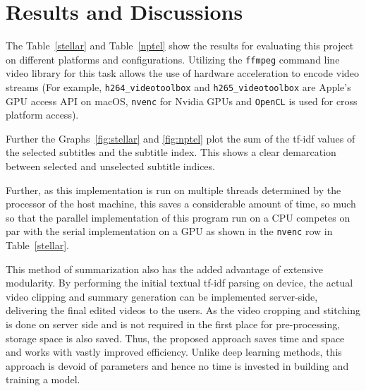 
\chapter{Results and Discussions} %

\label{Chapter4} %



	The Table~\ref{stellar} and Table~\ref{nptel} show the results for evaluating this project on different platforms and configurations. Utilizing the \texttt{ffmpeg} command line video library for this task allows the use of hardware acceleration to encode video streams (For example, \texttt{h264\_videotoolbox} and \texttt{h265\_videotoolbox} are Apple's GPU access API on macOS, \verb|nvenc| for Nvidia GPUs and \texttt{OpenCL} is used for cross platform access). 
	
	Further the Graphs~\ref{fig:stellar} and \ref{fig:nptel} plot the sum of the tf-idf values of the selected subtitles and the subtitle index. This shows a clear demarcation between selected and unselected subtitle indices.
	
	Further, as this implementation is run on multiple threads determined by the processor of the host machine, this saves a considerable amount of time, so much so that the parallel implementation of this program run on a CPU competes on par with the serial implementation on a GPU as shown in the \texttt{nvenc} row in Table~\ref{stellar}.
	
	 This method of summarization also has the added advantage of extensive modularity. By performing the initial textual tf-idf parsing on device, the actual video clipping and summary generation can be implemented server-side, delivering the final edited videos to the users. As the video cropping and stitching is done on server side and is not required in the first place for pre-processing, storage space is also saved. Thus, the proposed approach saves time and space and works with vastly improved efficiency. Unlike deep learning methods, this approach is devoid of parameters and hence no time is invested in building and training a model. 

